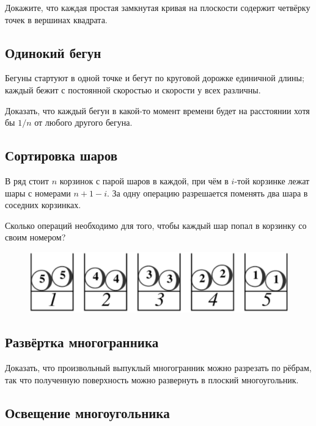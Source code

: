 Докажите, что каждая простая замкнутая кривая на плоскости содержит четвёрку точек в вершинах квадрата.

\subsection*{Одинокий бегун}

Бегуны  стартуют в одной точке и бегут по круговой дорожке единичной длины;
каждый бежит с постоянной скоростью и скорости у всех различны.

Доказать, что каждый бегун в какой-то момент времени будет на расстоянии хотя бы $1/n$ от любого другого бегуна.

\subsection*{Сортировка шаров}

В ряд стоит $n$ корзинок с парой шаров в каждой, при чём в $i$-той корзинке лежат шары с номерами $n+1-i$.
За одну операцию разрешается поменять два шара в соседних корзинках.

Сколько операций необходимо для того, чтобы каждый шар попал в корзинку со своим номером?

\begin{figure}[h!]
\centering
\includegraphics[scale=0.5]{Figs/UnsolvedPuzzles/bins}
\end{figure}

\subsection*{Развёртка многогранника}

Доказать, что произвольный выпуклый многогранник можно разрезать по рёбрам, так что полученную поверхность можно развернуть в плоский многоугольник.

\subsection*{Освещение многоугольника}

